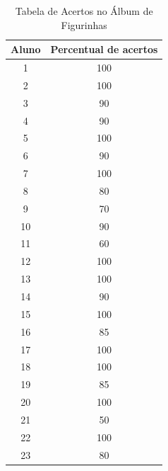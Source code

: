 \begin{table}[htbp] \centering
    \caption{Tabela de Acertos no Álbum de Figurinhas} \label{tab:Acertos do Encontro 12}
    \begin{tabular}{|c|c|}
        \hline
        \textbf{Aluno} & \textbf{Percentual de acertos} \\
        \hline
        1              & 100                            \\ \hline
        2              & 100                            \\ \hline
        3              & 90                             \\ \hline
        4              & 90                             \\ \hline
        5              & 100                            \\ \hline
        6              & 90                             \\ \hline
        7              & 100                            \\ \hline
        8              & 80                             \\ \hline
        9              & 70                             \\ \hline
        10             & 90                             \\ \hline
        11             & 60                             \\ \hline
        12             & 100                            \\ \hline
        13             & 100                            \\ \hline
        14             & 90                             \\ \hline
        15             & 100                            \\ \hline
        16             & 85                             \\ \hline
        17             & 100                            \\ \hline
        18             & 100                            \\ \hline
        19             & 85                             \\ \hline
        20             & 100                            \\ \hline
        21             & 50                             \\ \hline
        22             & 100                            \\ \hline
        23             & 80                             \\ \hline
    \end{tabular}
    \legend{\legendaTabela}
\end{table}


